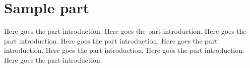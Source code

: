 \chapter{Sample part}

Here goes the part introduction.
Here goes the part introduction.
Here goes the part introduction.
Here goes the part introduction.
Here goes the part introduction.
Here goes the part introduction.
Here goes the part introduction.
Here goes the part introduction.




